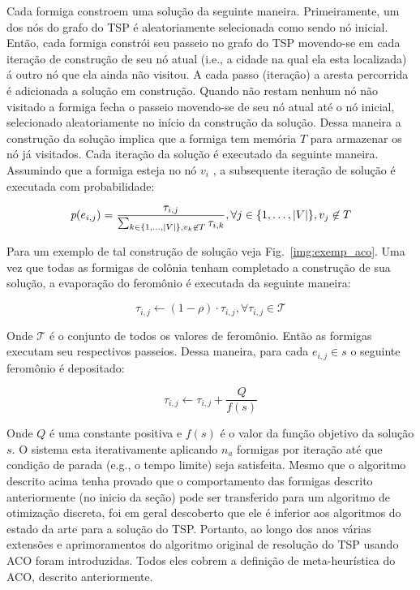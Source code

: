 Cada formiga constroem uma solução da seguinte maneira.
Primeiramente, um dos nós do grafo do TSP é aleatoriamente selecionada como sendo nó inicial.
Então, cada formiga constrói seu passeio no grafo do TSP movendo-se em cada iteração de construção
de seu nó atual (i.e., a cidade na qual ela esta localizada) á outro nó que ela ainda não visitou.
A cada passo (iteração) a aresta percorrida é adicionada a solução em construção. Quando não 
restam nenhum nó não visitado a formiga fecha o passeio movendo-se de seu nó atual até
o nó inicial, selecionado aleatoriamente no início da construção da solução. Dessa maneira a 
construção da solução implica que a formiga tem memória $T$ para armazenar os nó já
visitados. Cada iteração da solução é executado da seguinte maneira. 
Assumindo que a formiga esteja no nó $v_i$ , a subsequente iteração de solução é executada com probabilidade:

\begin{equation}
  \emph{p}(e_{i,j}) = \frac{\tau_{i,j}}{\sum_{k \in \lbrace 1,\dots,
  \vert V \vert\rbrace, v_k \not\in T}\tau_{i,k}},
  \forall j \in \lbrace 1,\dots,\vert V \vert\rbrace, v_j \not\in T
\end{equation}

Para um exemplo de tal construção de solução  veja Fig.~\ref{img:exemp_aco}.
Uma vez que todas as formigas de colônia tenham completado a construção de sua
solução, a evaporação do feromônio é executada da seguinte maneira:

\begin{equation}
  \tau_{i,j} \leftarrow (1-\rho)\cdot \tau_{i,j}, \forall \tau_{i,j}\in \mathcal{T}
\end{equation}

Onde $\mathcal{T }$ é o conjunto de todos os valores de feromônio.
Então as formigas executam seu respectivos passeios. Dessa maneira,
para cada $e_{i,j} \in s$ o seguinte feromônio é depositado:

\begin{equation}
  \tau_{i,j} \leftarrow \tau_{i,j} + \frac{Q}{f(s)}
\end{equation}

Onde $Q$ é uma constante positiva e $f(s)$ é o valor da função objetivo
da solução $s$. O sistema esta iterativamente aplicando $n_a$ 
formigas por iteração até que condição de parada
(e.g., o tempo limite) seja satisfeita.
Mesmo que o algoritmo descrito acima tenha provado que o comportamento das formigas
descrito anteriormente (no inicio da seção) pode ser transferido para um algoritmo 
de otimização discreta, foi em geral descoberto que ele é inferior aos algoritmos do estado da arte
para a solução do TSP\@. Portanto, ao longo dos anos várias extensões e aprimoramentos do algoritmo
original de resolução do TSP usando ACO foram introduzidas. Todos eles cobrem a definição de
meta-heurística do ACO,
descrito anteriormente.
